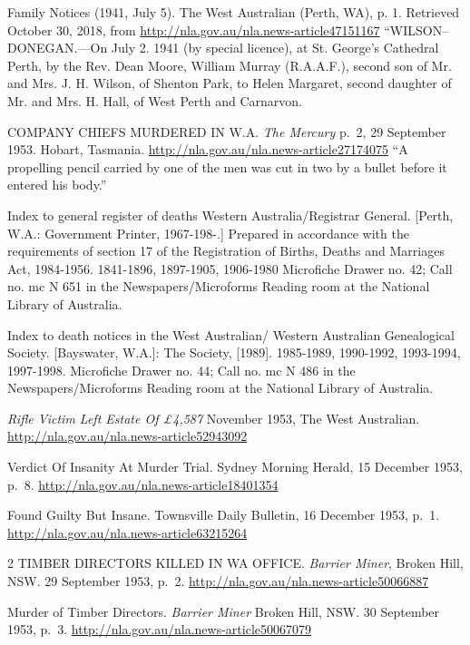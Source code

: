 \begin{thebibliography}{999}
    Family Notices (1941, July 5). The West Australian (Perth, WA), p. 1.
    Retrieved October 30, 2018, from \url{http://nla.gov.au/nla.news-article47151167}
    ``WILSON--DONEGAN.---On July 2. 1941 (by special licence), at St. George's Cathedral Perth, by the Rev. Dean Moore,
    William Murray (R.A.A.F.), second son of Mr. and Mrs. J. H. Wilson, of Shenton Park,
    to Helen Margaret, second daughter of Mr. and Mrs. H. Hall, of West Perth and Carnarvon.

	 COMPANY CHIEFS MURDERED IN W.A. \emph{The Mercury} p.\ 2, 29 September 1953. Hobart, Tasmania.
	 \url{http://nla.gov.au/nla.news-article27174075}
	 ``A propelling pencil carried by one of the men was cut in two by a bullet before it entered his body.''

	Index to general register of deaths Western Australia/Registrar General. [Perth, W.A.: Government Printer, 1967-198-.] Prepared in accordance with the requirements of section 17 of the Registration of Births, Deaths and Marriages Act, 1984-1956. 1841-1896, 1897-1905, 1906-1980 Microfiche Drawer no. 42; Call no. mc N 651 in the Newspapers/Microforms Reading room at the National Library of Australia.

	Index to death notices in the West Australian/ Western Australian Genealogical Society. [Bayswater, W.A.]: The Society, [1989]. 1985-1989, 1990-1992, 1993-1994, 1997-1998. Microfiche Drawer no. 44; Call no. mc N 486 in the Newspapers/Microforms Reading room at the National Library of Australia.

	\emph{Rifle Victim Left Estate Of \pounds 4,587} November 1953, The West Australian.
	\url{http://nla.gov.au/nla.news-article52943092}

	Verdict Of Insanity At Murder Trial. Sydney Morning Herald, 15 December 1953, p.\ 8.
	\url{http://nla.gov.au/nla.news-article18401354}

	Found Guilty But Insane. Townsville Daily Bulletin, 16 December 1953, p.\ 1.
	\url{http://nla.gov.au/nla.news-article63215264}

	 2 TIMBER DIRECTORS KILLED IN WA OFFICE. \emph{Barrier Miner}, Broken Hill, NSW. 29 September 1953, p.\ 2.
	 \url{http://nla.gov.au/nla.news-article50066887}

	Murder of Timber Directors. \emph{Barrier Miner} Broken Hill, NSW. 30 September 1953, p.\ 3.
	\url{http://nla.gov.au/nla.news-article50067079}


\end{thebibliography}
